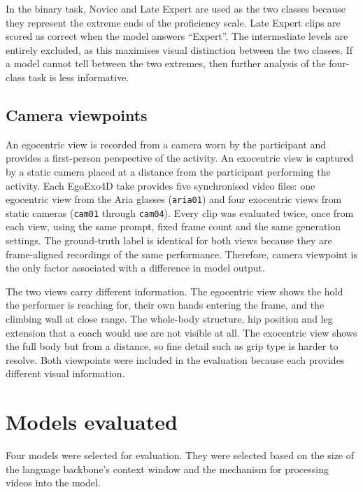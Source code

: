 \documentclass[logo,msc]{infthesis}
\begin{document}
In the binary task, Novice and Late Expert are used as the two classes
because they represent the extreme ends of the proficiency scale. Late
Expert clips are scored as correct when the model answers ``Expert''. The
intermediate levels are entirely excluded, as this maximises visual
distinction between the two classes. If a model cannot tell between the two
extremes, then further analysis of the four-class task is less informative.

\subsection{Camera viewpoints}

An egocentric view is recorded from a camera worn by the participant and
provides a first-person perspective of the activity. An exocentric view is
captured by a static camera placed at a distance from the participant
performing the activity. Each EgoExo4D take provides five synchronised
video files: one egocentric view from the Aria glasses (\texttt{aria01})
and four exocentric views from static cameras (\texttt{cam01} through
\texttt{cam04}). Every clip was evaluated twice, once from each view, using
the same prompt, fixed frame count and the same generation settings. The
ground-truth label is identical for both views because they are
frame-aligned recordings of the same performance. Therefore, camera
viewpoint is the only factor associated with a difference in model output.

The two views carry different information. The egocentric view shows the
hold the performer is reaching for, their own hands entering the frame, and
the climbing wall at close range. The whole-body structure, hip position
and leg extension that a coach would use are not visible at all. The
exocentric view shows the full body but from a distance, so fine detail
such as grip type is harder to resolve. Both viewpoints were included in
the evaluation because each provides different visual information.

\section{Models evaluated}

Four models were selected for evaluation. They were selected based on the
size of the language backbone's context window and the mechanism for
processing videos into the model.
\end{document}
